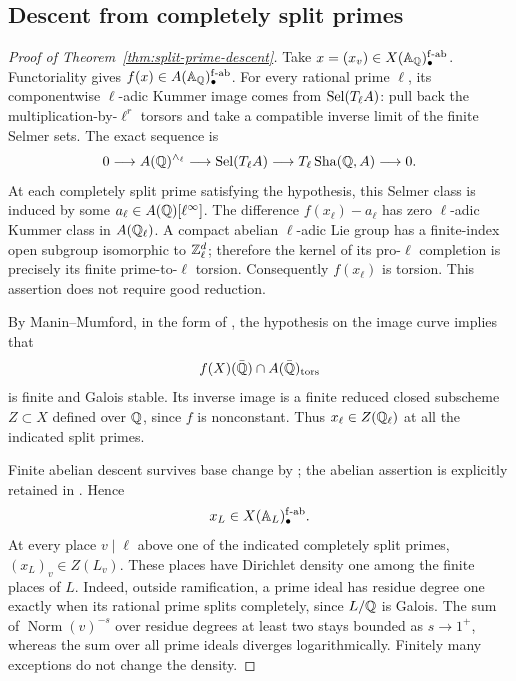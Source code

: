 \subsection{Descent from completely split primes}
\label{subsec:split-prime-descent}

\begin{proof}[Proof of Theorem~\ref{thm:split-prime-descent}]
Take $x=(x_v)\in X(\mathbb A_\mathbb Q)_\bullet^{\mathrm{f\text{-}ab}}$.
Functoriality gives $f(x)\in A(\mathbb A_\mathbb Q)_\bullet^{\mathrm{f\text{-}ab}}$.
For every rational prime $\ell$, its componentwise $\ell$-adic
Kummer image comes from $\operatorname{Sel}(T_\ell A)$: pull back the
multiplication-by-$\ell^r$ torsors and take a compatible inverse
limit of the finite Selmer sets. The exact sequence is
\[
0\longrightarrow A(\mathbb Q)^{\wedge_\ell}
\longrightarrow\operatorname{Sel}(T_\ell A)
\longrightarrow T_\ell\operatorname{Sha}(\mathbb Q,A)\longrightarrow0.
\]
At each completely split prime satisfying the hypothesis, this
Selmer class is induced by some $a_\ell\in A(\mathbb Q)[\ell^\infty]$.
The difference $f(x_\ell)-a_\ell$ has zero $\ell$-adic Kummer
class in $A(\mathbb Q_\ell)$. A compact abelian $\ell$-adic Lie group
has a finite-index open subgroup isomorphic to $\mathbb Z_\ell^d$;
therefore the kernel of its pro-$\ell$ completion is precisely
its finite prime-to-$\ell$ torsion. Consequently $f(x_\ell)$
is torsion. This assertion does not require good reduction.

By Manin--Mumford, in the form of
\citet[Theorem~1.1$^*$, p.~151]{PilaZannier2008}, the hypothesis
on the image curve implies that
\[
f(X)(\bar{\mathbb Q})\cap A(\bar{\mathbb Q})_{\rm tors}
\]
is finite and Galois stable. Its inverse image is a finite reduced
closed subscheme $Z\subset X$ defined over $\mathbb Q$, since $f$ is
nonconstant. Thus $x_\ell\in Z(\mathbb Q_\ell)$ at all the indicated
split primes.

Finite abelian descent survives base change by
\citet[Proposition~5.16, p.~370]{Stoll2007}; the abelian assertion
is explicitly retained in \citet[\S2(4)]{StollErrata2017}. Hence
\[
x_L\in X(\mathbb A_L)_\bullet^{\mathrm{f\text{-}ab}}.
\]
At every place $v\mid\ell$ above one of the indicated completely
split primes, $(x_L)_v\in Z(L_v)$. These places have Dirichlet
density one among the finite places of $L$. Indeed, outside
ramification, a prime ideal has residue degree one exactly when
its rational prime splits completely, since $L/\mathbb Q$ is Galois.
The sum of $\operatorname{Norm}(v)^{-s}$ over residue degrees at
least two stays bounded as $s\to1^+$, whereas the sum over all
prime ideals diverges logarithmically. Finitely many exceptions
do not change the density.


\end{proof}
